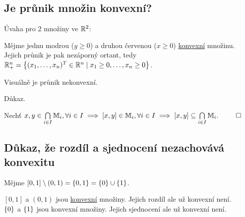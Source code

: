 \subsection{Je průnik množin konvexní?}
Úvaha pro 2 množiny ve $\mathbb{R}^2$:

\begin{multicols}{2}
    Mějme jednu modrou ($y \geq 0$) a druhou červenou ($x \geq 0$) \hyperref[sec:konvex]{konvexní} množinu. Jejich průnik je pak nezáporný ortant,
    tedy \\
    $\mathbb{R}_+^n = \left\lbrace (x_1, \dots, x_n)^T \in \mathbb{R}^n \mid x_1 \geq 0, \dots, x_n \geq 0 \right\rbrace$.

    Visuálně je průnik nekonvexní.

    Důkaz.

    Nechť ${x,y \in \bigcap\limits_{i \in I} \mathbb{M}_{i}, \forall i \in I \implies [x, y] \in \mathbb{M}_i, \forall i \in I
    \implies [x,y] \subseteq \bigcap\limits_{i \in I} \mathbb{M}_{i}.}$
    $\qed$

\columnbreak

    \begin{center}
    \end{center}
\end{multicols}

\subsection{Důkaz, že rozdíl a sjednocení nezachovává konvexitu}
Mějme $[0,1] \setminus (0,1) = \left\lbrace 0,1 \right\rbrace = \left\lbrace 0 \right\rbrace \cup \left\lbrace 1 \right\rbrace$.

$[0,1]$ a $(0,1)$ jsou \hyperref[sec:konvex]{konvexní} množiny. Jejich rozdíl ale už konvexní není.\\
$\left\lbrace 0 \right\rbrace$ a $\left\lbrace 1 \right\rbrace$ jsou konvexní množiny. Jejich sjednocení ale už konvexní není.

